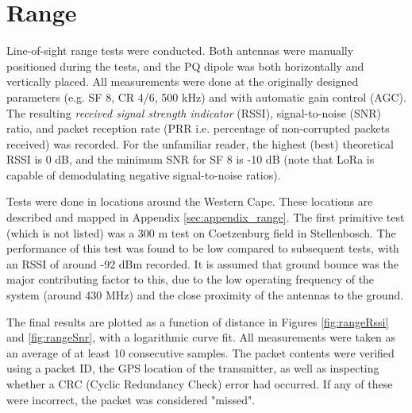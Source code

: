 \graphicspath{{./figures}}

\section{Range}

Line-of-sight range tests were conducted. Both antennas were manually positioned during the tests, and the PQ dipole was both horizontally and vertically placed. All measurements were done at the originally designed parameters (e.g. SF 8, CR 4/6, 500 kHz) and with automatic gain control (AGC). The resulting \textit{received signal strength indicator} (RSSI), signal-to-noise (SNR) ratio, and packet reception rate (PRR i.e. percentage of non-corrupted packets received) was recorded. For the unfamiliar reader, the highest (best) theoretical RSSI is 0 dB, and the minimum SNR for SF 8 is -10 dB (note that LoRa is capable of demodulating negative signal-to-noise ratios).

Tests were done in locations around the Western Cape. These locations are described and mapped in Appendix \ref{sec:appendix_range}. The first primitive test (which is not listed) was a 300 m test on Coetzenburg field in Stellenbosch. The performance of this test was found to be low compared to subsequent tests, with an RSSI of around -92 dBm recorded. It is assumed that ground bounce was the major contributing factor to this, due to the low operating frequency of the system (around 430 MHz) and the close proximity of the antennas to the ground.

The final results are plotted as a function of distance in Figures \ref{fig:rangeRssi} and \ref{fig:rangeSnr}, with a logarithmic curve fit. All measurements were taken as an average of at least 10 consecutive samples. The packet contents were verified using a packet ID, the GPS location of the transmitter, as well as inspecting whether a CRC (Cyclic Redundancy Check) error had occurred. If any of these were incorrect, the packet was considered "missed".

